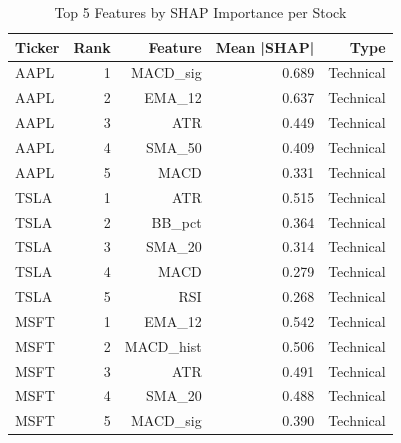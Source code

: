 \begin{table}[h]
\centering
\caption{Top 5 Features by SHAP Importance per Stock}
\label{tab:shap}
\begin{tabular}{lrrrr}
\hline
Ticker & Rank & Feature & Mean |SHAP| & Type \\
\hline
AAPL & 1 & MACD_sig & 0.689 & Technical \\
AAPL & 2 & EMA_12 & 0.637 & Technical \\
AAPL & 3 & ATR & 0.449 & Technical \\
AAPL & 4 & SMA_50 & 0.409 & Technical \\
AAPL & 5 & MACD & 0.331 & Technical \\
TSLA & 1 & ATR & 0.515 & Technical \\
TSLA & 2 & BB_pct & 0.364 & Technical \\
TSLA & 3 & SMA_20 & 0.314 & Technical \\
TSLA & 4 & MACD & 0.279 & Technical \\
TSLA & 5 & RSI & 0.268 & Technical \\
MSFT & 1 & EMA_12 & 0.542 & Technical \\
MSFT & 2 & MACD_hist & 0.506 & Technical \\
MSFT & 3 & ATR & 0.491 & Technical \\
MSFT & 4 & SMA_20 & 0.488 & Technical \\
MSFT & 5 & MACD_sig & 0.390 & Technical \\
\hline
\end{tabular}
\end{table}